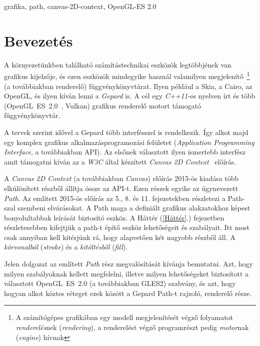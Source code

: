 \documentclass[12pt]{report}
\theoremstyle{definition}
\newcommand{\inenglish}[1]{\textsl{#1}}
\newcommand{\inenglishfn}[1]{\footnotesize{\inenglish{#1}}}
\begin{document}
grafika, path, canvas-2D-context, OpenGL-ES 2.0



    \chapter*{Bevezetés}
    \label{Bevezetés}

  A környezetünkben található számítástechnikai eszközök
legtöbbjének van grafikus kijelzője, és ezen eszközök mindegyike használ
valamilyen megjelenítő~\footnote{A számítógépes grafikában egy modell
megjelenítését végző folyamatot \emph{renderelés}nek (\inenglishfn{rendering}),
a renderelést végző programrészt pedig \emph{motor}nak (\inenglishfn{engine})
hívnak} (a továbbiakban renderelő) függvénykönyvtárat. Ilyen például a Skia, a
Cairo, az OpenGL, és ilyen kíván lenni a \emph{Gepard} is. A cél egy
\emph{C++11}-es nyelven írt és több (\mbox{OpenGL~ES~2.0
\cite{Munshi:2008:OEP:1481069}}, Vulkan) grafikus renderelő motort támogató
függvénykönyvtár.

  A tervek szerint idővel a Gepard több interfésszel is rendelkezik.
Így alkot majd egy komplex grafikus alkalmazásprogramozási felületet
(\inenglish{Application Programming Interface}, a továbbiakban API). Az elsőnek
választott ilyen ismertebb interfész amit támogatni kíván az a \emph{W3C} által
készített \emph{Canvas 2D Context}~\cite{Cabanier:14:HCC} előírás.

  A \emph{Canvas 2D Context} (a továbbiakban \emph{Canvas}) előírás
2015-ös kiadása több elkülönített részből állítja össze az API-t. Ezen részek
egyike az úgynevezett \emph{Path}. Az említett 2015-ös előírás az 5., 8. és 11.
fejezetekben részletezi a Path-szal szembeni elvárásokat. A Path maga a
definiált grafikus alakzatokhoz képest bonyolultabbak leírását biztosító
eszköz. A Háttér (\ref{Háttér}.) fejezetben részletesebben kifejtjük a path-t
építő eszköz lehetőségeit és szabályait. Itt most csak annyiban kell kitérjünk
rá, hogy alapvetően két nagyobb részből áll. A \emph{körvonalból}
(\inenglish{stroke}) és a \emph{kitöltésből} (\inenglish{fill}).

  Jelen dolgozat az említett \emph{Path} rész megvalósítását kívánja bemutatni.
Azt, hogy milyen szabályoknak kellett megfelelni, illetve milyen lehetőségeket
biztosított a választott OpenGL~ES~2.0 (a továbbiakban GLES2) szabvány, és azt,
hogy hogyan alkot köztes réteget ezek között a Gepard Path-t rajzoló, renderelő
része.
\end{document}
